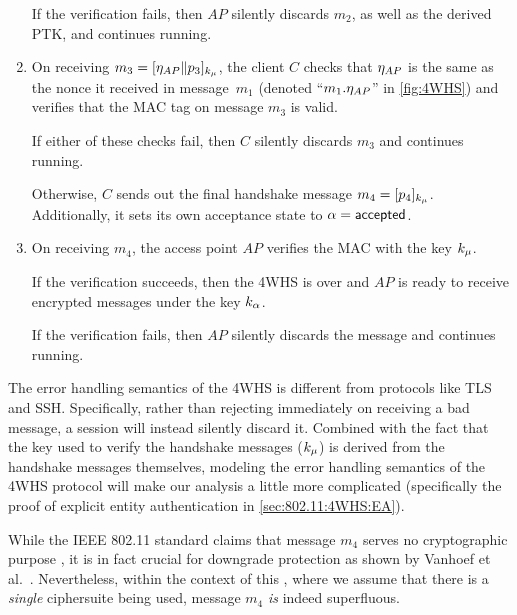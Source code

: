 \begin{enumerate}
	 

	If the verification fails,
	then $AP$ silently discards $m_2$,
	as well as the derived PTK,  
	and continues running.
	
	\item 
	On receiving $m_3 = [\eta_{AP} \| p_3]_{k_{\mu}}$, 
	the client $C$  checks that $\eta_{AP}$ is the same as the nonce it received in message~$m_1$ 
	(denoted ``$m_1.\eta_{AP}$'' in \cref{fig:4WHS})
	and verifies that the MAC tag on message $m_3$ is valid.

	If either of these checks fail,
	then $C$ silently discards $m_3$ and continues running.

	Otherwise,
	$C$ sends out the final handshake message $m_4 = [p_4]_{k_\mu}$.
	Additionally,
	it sets its own acceptance state to $\alpha = \mathsf{accepted}$. 
	

	
	\item On receiving $m_4$, the access point $AP$ verifies the MAC with the key $k_\mu$.

	If the verification succeeds,
	then the 4WHS is over and $AP$ is ready to receive encrypted messages under the key $k_\alpha$.

	If the verification fails,
	then $AP$ silently discards the message and continues running.

\end{enumerate}





\begin{remark}
The error handling semantics of the 4WHS is different from protocols like TLS and SSH.
Specifically,
rather than rejecting immediately on receiving a bad message,
a session will instead silently discard it.
Combined with the fact that the key used to verify the handshake messages ($k_{\mu}$)
is derived from the handshake messages themselves,
modeling the error handling semantics of the 4WHS protocol will make our analysis a little more complicated
(specifically the proof of explicit entity authentication in \cref{sec:802.11:4WHS:EA}).
\end{remark}

\begin{remark}
While the IEEE 802.11 standard claims that message $m_4$ serves no cryptographic purpose \cite[§11.6.6.8.4]{IEEE:2012:802.11},
it is in fact crucial for downgrade protection as shown by Vanhoef et al.~\cite{ASIACCS:VanSchPie17}.
Nevertheless,
within the context of this ,
where we assume that there is a \emph{single} ciphersuite being used,
message $m_4$ \emph{is} indeed superfluous.
\end{remark}







